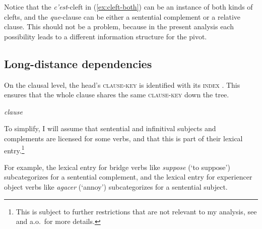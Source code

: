 Notice that the \emph{c'est}-cleft in (\ref{ex:cleft-both}) can be an instance of both kinds of clefts, and the \emph{que}-clause can be either a sentential complement or a relative clause. This should not be a problem, because in the present analysis each possibility leads to a different information structure for the pivot.

\z 



\subsection{Long-distance dependencies}
\label{ch:hpsg-basics-ldd}

On the clausal level, the head's \textsc{clause-key} is identified with its \textsc{index} \citep[120]{Song.2017}. This ensures that the whole clause shares the same \textsc{clause-key} down the tree.

\ea
\textit{clause} \avm{$\to$}\nopagebreak

\label{avm:clause-clause-key}
\z 

To simplify, I will assume that sentential and infinitival subjects and complements are licensed for some verbs, and that this is part of their lexical entry.\footnote{This is subject to further restrictions that are not relevant to my analysis, see \citet[151--156]{Pollard.1994} and \citet{Webelhuth.2012} a.o.\ for more details.}

For example, the lexical entry for bridge verbs like \emph{suppose} (`to suppose') subcategorizes for a sentential complement, and the lexical entry for experiencer object verbs like \emph{agacer} (`annoy') subcategorizes for a sentential subject. 

\eal
{}
\label{ex:supposer-sentential-complement}
\zl 

